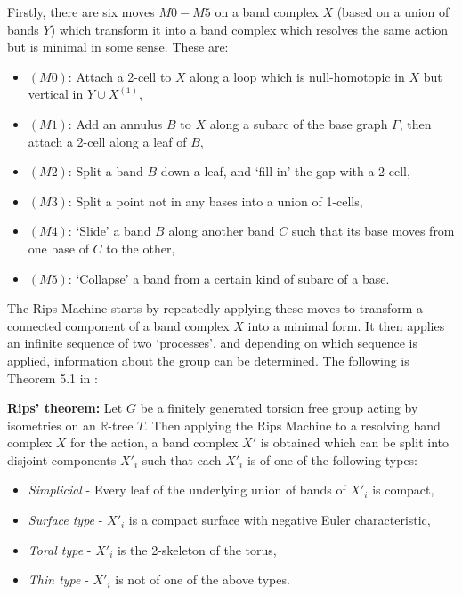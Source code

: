 Firstly, there are six moves $M0-M5$ on a band complex $X$ (based on a union of bands $Y$) which transform it into a band complex which resolves the same action but is minimal in some sense. These are:
\begin{itemize}
    \item $(M0)$: Attach a 2-cell to $X$ along a loop which is null-homotopic in $X$ but vertical in $Y\cup X^{(1)}$,
    \item $(M1)$: Add an annulus $B$ to $X$ along a subarc of the base graph $\Gamma$, then attach a 2-cell along a leaf of $B$,
    \item $(M2)$: Split a band $B$ down a leaf, and `fill in' the gap with a 2-cell,
    \item $(M3)$: Split a point not in any bases into a union of 1-cells,
    \item $(M4)$: `Slide' a band $B$ along another band $C$ such that its base moves from one base of $C$ to the other,
    \item $(M5)$: `Collapse' a band from a certain kind of subarc of a base.
\end{itemize}

The Rips Machine starts by repeatedly applying these moves to transform a connected component of a band complex $X$ into a minimal form. It then applies an infinite sequence of two `processes', and depending on which sequence is applied, information about the group can be determined. The following is Theorem 5.1 in \cite{Bestvina_trees}:

\begin{theorem}
    \textbf{Rips' theorem:} Let $G$ be a finitely generated torsion free group acting by isometries on an $\mathbb{R}$-tree $T$. Then applying the Rips Machine to a resolving band complex $X$ for the action, a band complex $X'$ is obtained which can be split into disjoint components $X'_i$ such that each $X'_i$ is of one of the following types:
    \begin{itemize}
        \item \emph{Simplicial} - Every leaf of the underlying union of bands of $X'_i$ is compact,
        \item \emph{Surface type} - $X'_i$ is a compact surface with negative Euler characteristic,
        \item \emph{Toral type} - $X'_i$ is the 2-skeleton of the torus,
        \item \emph{Thin type} - $X'_i$ is not of one of the above types.
    \end{itemize}
\end{theorem}

